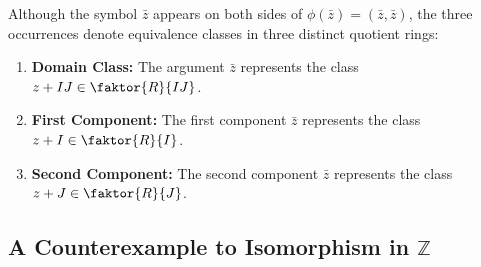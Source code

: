 \begin{content}
\begin{steps}
Although the symbol $\bar{z}$ appears on both sides of $\phi(\bar{z}) = (\bar{z}, \bar{z})$, the three occurrences denote equivalence classes in three distinct quotient rings:
\begin{enumerate}[label=\textbf{(\arabic*)}]
    \setcounter{enumi}{0} \item \textbf{Domain Class:} The argument $\bar{z}$ represents the class $z + IJ \in \faktor{R}{IJ}$.
    \setcounter{enumi}{1} \item \textbf{First Component:} The first component $\bar{z}$ represents the class $z + I \in \faktor{R}{I}$.
    \setcounter{enumi}{2} \item \textbf{Second Component:} The second component $\bar{z}$ represents the class $z + J \in \faktor{R}{J}$.
\end{enumerate}
\end{steps}
\end{content}

\subsection{A Counterexample to Isomorphism in \texorpdfstring{$\mathbb{Z}$}{Z}}

